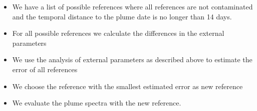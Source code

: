 \documentclass  [
  paper    = a4,
  BCOR     = 10mm,
  twoside,
  fontsize = 12pt,
  fleqn,
  toc      = bibnumbered,
  toc      = listofnumbered,
  numbers  = noendperiod,
  headings = normal,
  listof   = leveldown,
  version  = 3.03
]                                       {scrreprt}
\begin{document}
	\begin{itemize}
		\item We have a list of possible references where all references are not contaminated and the temporal distance to the plume date is no longer than 14 days.
		\item For all possible references we calculate the differences in the external parameters
		\item We use the analysis of external parameters as described above to estimate the  error of all references
		\item We choose the reference with the smallest estimated  error as new reference
		\item We evaluate the plume spectra with the new reference.
	\end{itemize}
\end{document}
